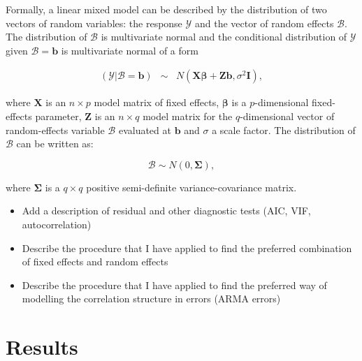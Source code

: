 \documentclass[12pt]{iopart}
\begin{document}
Formally, a linear mixed model can be described by the distribution of two vectors of random variables: the response $\mathscr{Y}$ and the vector of random effects $\mathscr{B}$. The distribution of $\mathscr{B}$ is multivariate normal and the conditional distribution of $\mathscr{Y}$ given $\mathscr{B}=\mathbf{b}$ is multivariate normal of a form %




\begin{equation}\label{MixedGeneral}
\begin{array}{lcl}

(\mathscr{Y}|\mathscr{B}=\mathbf{b})& \sim & \mathit{N}(\mathbf{X}\mathbf{\beta}+\mathbf{Z}\mathbf{b},\sigma^2\mathbf{I}),

\end{array}
\end{equation}

where $\mathbf{X}$ is an $n \times p$ model matrix of fixed effects, $\mathbf{\beta}$ is a $p$-dimensional fixed-effects parameter, $\mathbf{Z}$ is an $n \times q$ model matrix for the $q$-dimensional vector of random-effects variable $\mathscr{B}$ evaluated at $\mathbf{b}$ and $\sigma$ a scale factor. The distribution of $\mathscr{B}$ can be written as: 

\begin{equation}\label{ranefDist}
\mathscr{B} \sim \mathit{N}(0,\mathbf{\Sigma}),
\end{equation}

where $\mathbf{\Sigma}$ is a $q \times q$ positive semi-definite variance-covariance matrix.

\color{blue}
\begin{itemize}
\item Add a description of residual and other diagnostic tests (AIC, VIF, autocorrelation)
\item Describe the procedure that I have applied to find the preferred combination of fixed effects and random effects
\item Describe the procedure that I have applied to find the preferred way of modelling the  correlation structure in errors (ARMA errors)
\end{itemize}
\color{black}





	\section{Results}\label{Results}
\end{document}
